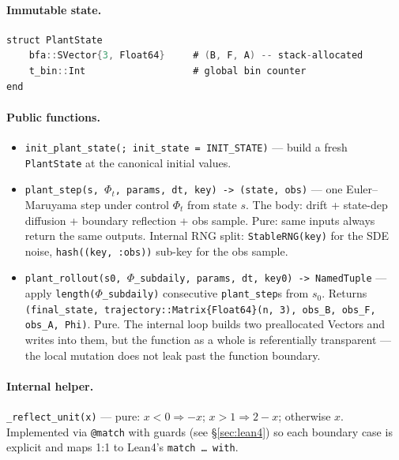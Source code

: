 \documentclass[11pt,a4paper]{article}
\begin{document}
\paragraph{Immutable state.}

\begin{lstlisting}[language=Java]
struct PlantState
    bfa::SVector{3, Float64}     # (B, F, A) -- stack-allocated
    t_bin::Int                   # global bin counter
end
\end{lstlisting}

\paragraph{Public functions.}

\begin{itemize}[itemsep=2pt,leftmargin=*]
\item \texttt{init\_plant\_state(; init\_state = INIT\_STATE)} ---
  build a fresh \texttt{PlantState} at the canonical initial values.

\item \texttt{plant\_step(s, $\Phi_t$, params, dt, key) -> (state,
  obs)} --- one Euler--Maruyama step under control $\Phi_t$ from state
  $s$. The body: drift + state-dep diffusion + boundary reflection
  + obs sample. Pure: same inputs always return the same outputs.
  Internal RNG split: \texttt{StableRNG(key)} for the SDE noise,
  \texttt{hash((key, :obs))} sub-key for the obs sample.

\item \texttt{plant\_rollout(s0, $\Phi$\_subdaily, params, dt, key0)
  -> NamedTuple} --- apply \texttt{length($\Phi$\_subdaily)}
  consecutive \texttt{plant\_step}s from $s_0$. Returns
  \texttt{(final\_state, trajectory::Matrix\{Float64\}(n, 3),
  obs\_B, obs\_F, obs\_A, Phi)}. Pure. The internal loop builds
  two preallocated Vectors and writes into them, but the function
  as a whole is referentially transparent --- the local mutation
  does not leak past the function boundary.
\end{itemize}

\paragraph{Internal helper.}
\texttt{\_reflect\_unit(x)} --- pure: $x < 0 \Rightarrow -x$; $x > 1
\Rightarrow 2 - x$; otherwise $x$. Implemented via \texttt{@match}
with guards (see §\ref{sec:lean4}) so each boundary case is
explicit and maps 1:1 to Lean4's \texttt{match \dots\ with}.
\end{document}
